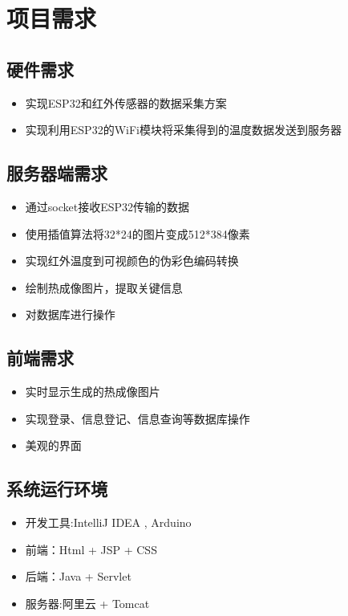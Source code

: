 \chapter{项目需求}
\section{硬件需求}
\begin{itemize}
    \item 实现ESP32和红外传感器的数据采集方案
    \item 实现利用ESP32的WiFi模块将采集得到的温度数据发送到服务器
    \end{itemize}
\section{服务器端需求}
\begin{itemize}
    \item 通过socket接收ESP32传输的数据
    \item 使用插值算法将32*24的图片变成512*384像素
    \item 实现红外温度到可视颜色的伪彩色编码转换
    \item 绘制热成像图片，提取关键信息
    \item 对数据库进行操作
    \end{itemize}
\section{前端需求}
\begin{itemize}
    \item 实时显示生成的热成像图片
    \item 实现登录、信息登记、信息查询等数据库操作
    \item 美观的界面
    \end{itemize}
\section{系统运行环境}
\begin{itemize}
    \item 开发工具:IntelliJ IDEA , Arduino
    \item 前端：Html + JSP + CSS
    \item 后端：Java + Servlet
    \item 服务器:阿里云 + Tomcat
    \end{itemize}